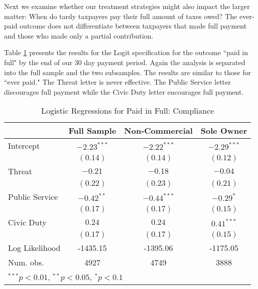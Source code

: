 \documentclass[12pt,titlepage]{article}
\begin{document}
Next we examine whether our treatment strategies might also impact the
larger matter: When do tardy taxpayers pay their full amount of taxes
owed?  The ever-paid outcome does not differentiate between taxpayers
that made full payment and those who made only a partial contribution.

Table \ref{table:pf_log_I} presents the results for the Logit specification for
the outcome ``paid in full" by the end of our 30 day payment period.
Again the analysis is separated into the full sample and the
two subsamples.  The results are similar to those for ``ever paid."
The Threat letter is never effective.  The Public Service letter
discourages full payment while the Civic Duty letter encourages full
payment.

\begin{table}[htbp]
\caption{Logistic Regressions for Paid in Full: Compliance}
\begin{center}
\begin{tabular}{l c c c }
\hline
               & Full Sample & Non-Commercial & Sole Owner \\
\hline
Intercept      & $-2.23^{***}$ & $-2.22^{***}$ & $-2.29^{***}$ \\
               & $(0.14)$      & $(0.14)$      & $(0.12)$      \\
Threat         & $-0.21$       & $-0.18$       & $-0.04$       \\
               & $(0.22)$      & $(0.23)$      & $(0.21)$      \\
Public Service & $-0.42^{**}$  & $-0.44^{***}$ & $-0.29^{*}$   \\
               & $(0.17)$      & $(0.17)$      & $(0.15)$      \\
Civic Duty     & $0.24$        & $0.24$        & $0.41^{***}$  \\
               & $(0.17)$      & $(0.17)$      & $(0.15)$      \\
\hline
Log Likelihood & -1435.15      & -1395.06      & -1175.05      \\
Num. obs.      & 4927          & 4749          & 3888          \\
\hline
\multicolumn{4}{l}{\scriptsize{$^{***}p<0.01$, $^{**}p<0.05$, $^*p<0.1$}}
\end{tabular}
\label{table:pf_log_I}
\end{center}
\end{table}
\end{document}
